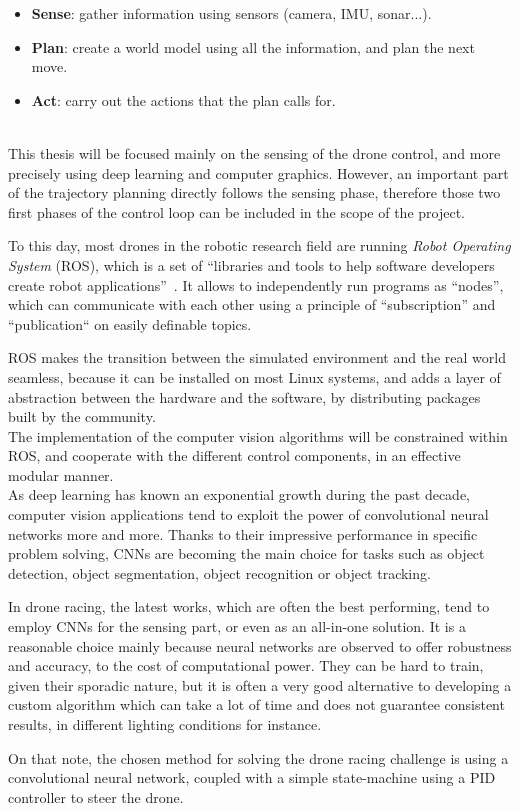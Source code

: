 \begin{itemize}
	\item{\textbf{Sense}}: gather information using sensors (camera, IMU, sonar...).
	\item{\textbf{Plan}}: create a world model using all the information, and plan
		the next move.
	\item{\textbf{Act}}: carry out the actions that the plan calls for.
\end{itemize}

~\\
This thesis will be focused mainly on the sensing of the drone control, and
more precisely using deep learning and computer graphics. However, an important
part of the trajectory planning directly follows the sensing phase, therefore
those two first phases of the control loop can be included in the scope of the
project.

To this day, most drones in the robotic research field are running \emph{Robot
Operating System} (ROS),  which is a set of ``libraries and tools to help
software developers create robot applications''~\cite{ROS}. It allows to
independently run programs as ``nodes'', which can communicate with each other
using a principle of ``subscription'' and ``publication`` on easily definable
topics.

ROS makes the transition between the simulated environment and the real world
seamless, because it can be installed on most Linux systems, and adds a layer
of abstraction between the hardware and the software, by distributing packages
built by the community.\\

The implementation of the computer vision algorithms will be constrained within
ROS, and cooperate with the different control components, in an effective
modular manner.\\

As deep learning has known an exponential growth during the past decade,
computer vision applications tend to exploit the power of convolutional neural
networks more and more. Thanks to their impressive performance in specific
problem solving, CNNs are becoming the main choice for tasks such as object
detection, object segmentation, object recognition or object tracking.

In drone racing, the latest works, which are often the best performing, tend to
employ CNNs for the sensing part, or even as an all-in-one solution. It is a
reasonable choice mainly because neural networks are observed to offer
robustness and accuracy, to the cost of computational power. They can be hard
to train, given their sporadic nature, but it is often a very good alternative
to developing a custom algorithm which can take a lot of time and does not
guarantee consistent results, in different lighting conditions for instance.

On that note, the chosen method for solving the drone racing challenge is
using a convolutional neural network, coupled with a simple state-machine 
using a PID controller to steer the drone.
